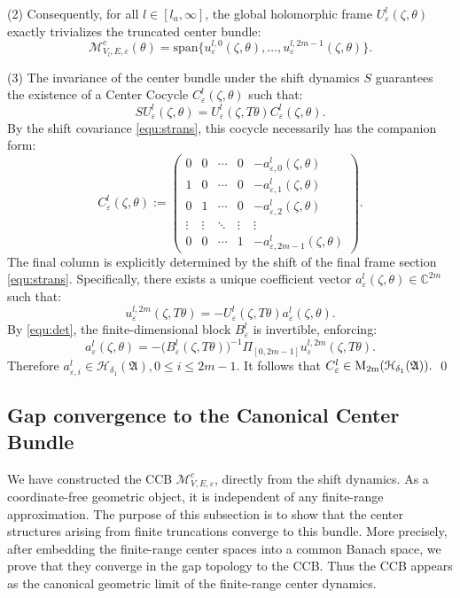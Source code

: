 \documentclass[reqno,11pt]{amsart}
\newcommand{\C}{{\mathbb C}}
\begin{document}
(2) Consequently, for all $l \in [l_a, \infty]$, the global holomorphic frame $U_\varepsilon^l(\zeta,\theta)$ exactly trivializes the truncated center bundle:
$$
\mathcal{M}_{V_l,E,\varepsilon}^c(\theta) = \mathrm{span}\{u_\varepsilon^{l,0}(\zeta,\theta), \dots, u_\varepsilon^{l,2m-1}(\zeta,\theta)\}.
$$

(3) The invariance of the center bundle under the shift dynamics $S$ guarantees the existence of a Center Cocycle $C_\varepsilon^l(\zeta,\theta) $ such that:
\begin{equation*}\label{equ:s}
S U_\varepsilon^l(\zeta,\theta) = U_\varepsilon^l(\zeta,T\theta) C_\varepsilon^l(\zeta,\theta).
\end{equation*}
By the shift covariance \eqref{equ:strans}, this cocycle necessarily has the  companion form:
\begin{equation}\label{eq:defAc}
C_\varepsilon^l(\zeta,\theta) :=
\begin{pmatrix}
0 & 0 & \cdots & 0 & -a^l_{\varepsilon,0}(\zeta,\theta)\\
1 & 0 & \cdots & 0 & -a^l_{\varepsilon,1}(\zeta,\theta)\\
0 & 1 & \cdots & 0 & -a^l_{\varepsilon,2}(\zeta,\theta)\\
\vdots & \vdots & \ddots & \vdots & \vdots\\
0 & 0 & \cdots & 1 & -a^l_{\varepsilon,2m-1}(\zeta,\theta)
\end{pmatrix}.
\end{equation}
The final column is explicitly determined by the shift of the final frame section \eqref{equ:strans}. Specifically, there exists a unique coefficient vector $a_\varepsilon^l(\zeta,\theta) \in \C^{2m}$ such that:
\begin{equation}\label{eq:defa}
u_\varepsilon^{l,2m}(\zeta,T\theta) = - U_\varepsilon^l(\zeta,T\theta) a_\varepsilon^l(\zeta,\theta).
\end{equation}
 By \eqref{equ:det}, the finite-dimensional block $B_\varepsilon^l$ is  invertible, enforcing:
$$
a^{l}_{\varepsilon}(\zeta,\theta)
=-\bigl(B_\varepsilon^l(\zeta,T\theta))^{-1}
\Pi_{[0,2m-1]}u^{l,2m}_\varepsilon(\zeta,T\theta).
$$
Therefore
$
a_{\varepsilon,i}^l\in\mathcal H_{\delta_1}(\mathfrak A),0\leq i\leq 2m-1.
$
It follows that
$
C_\varepsilon^l\in\rm M_{2m}(\mathcal H_{\delta_1}(\mathfrak A)).
$
\qed



\subsection{Gap convergence to the Canonical Center Bundle}
We have constructed the CCB
$\boldsymbol{\mathcal M}^c_{V,E,\varepsilon}$,
directly from the shift dynamics. As a coordinate-free geometric object, it is independent of any finite-range approximation. The purpose of this subsection is to show that the center structures arising from finite truncations converge to this bundle. More precisely, after embedding the finite-range center spaces into a common Banach space, we prove that they converge in the gap topology to the CCB. Thus the CCB appears as the canonical geometric limit of the finite-range center dynamics.
\end{document}
